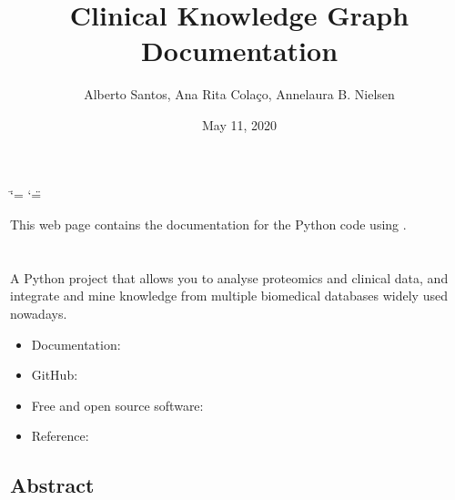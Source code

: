 \documentclass[letterpaper,10pt,english]{sphinxmanual}
\title{Clinical Knowledge Graph Documentation}
\date{May 11, 2020}
\author{Alberto Santos, Ana Rita Colaço, Annelaura B. Nielsen}
\begin{document}
\ifdefined\shorthandoff
  \ifnum\catcode`\=\string=\active\shorthandoff{=}\fi
  \ifnum\catcode`\"=\active{}\fi
\fi

\pagestyle{empty}
\sphinxmaketitle
\pagestyle{plain}
\sphinxtableofcontents
\pagestyle{normal}
\label{\detokenize{index::doc}}


This web page contains the documentation for the Python code using .




\chapter{}
\label{\detokenize{INTRO:clinical-knowledge-graph}}\label{\detokenize{INTRO::doc}}
 

A Python project that allows you to analyse proteomics and clinical data, and integrate and mine knowledge from multiple biomedical databases widely used nowadays.
\begin{itemize}
\item {} 
Documentation: 

\item {} 
GitHub: 

\item {} 
Free and open source software: 

\item {} 
Reference: 

\end{itemize}


\section{Abstract}
\label{\detokenize{INTRO:abstract}}
\end{document}

